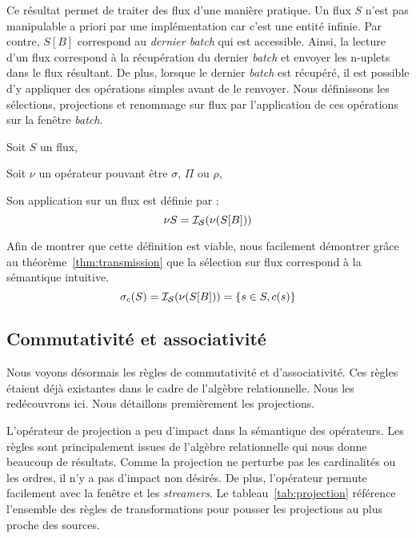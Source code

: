 Ce résultat permet de traiter des flux d'une manière pratique. Un flux $S$ n'est pas manipulable a priori par une implémentation car c'est une entité infinie. Par contre, $S[B]$ correspond au \textit{dernier batch} qui est accessible. Ainsi, la lecture d'un flux correspond à la récupération du dernier \textit{batch} et envoyer les n-uplets dans le flux résultant. De plus, lorsque le dernier \textit{batch} est récupéré, il est possible d'y appliquer des opérations simples avant de le renvoyer. Nous définissons les sélections, projections et renommage sur flux par l'application de ces opérations sur la fenêtre \textit{batch}.

\begin{coro}\label{cor:defunary}
    Soit $S$ un flux,

    Soit $\nu$ un opérateur pouvant être $\sigma$, $\Pi$ ou $\rho$,

    Son application sur un flux est définie par :
$$\nu S = \mathcal{I_S}(\nu(S[B]))$$
\end{coro}

Afin de montrer que cette définition est viable, nous facilement démontrer grâce au théorème~\ref{thm:transmission} que la sélection sur flux correspond à la sémantique intuitive. $$\sigma_c(S) = \mathcal{I_S}(\nu(S[B])) = \{s\in S, c(s)\}$$

\subsection{Commutativité et associativité}
Nous voyons désormais les règles de commutativité et d'associativité. Ces règles étaient déjà existantes dans le cadre de l'algèbre relationnelle. Nous les redécouvrons ici. Nous détaillons premièrement les projections.

L'opérateur de projection a peu d'impact dans la sémantique des opérateurs. Les règles sont principalement issues de l'algèbre relationnelle qui nous donne beaucoup de résultats. Comme la projection ne perturbe pas les cardinalités ou les ordres, il n'y a pas d'impact non désirés. De plus, l'opérateur permute facilement avec la fenêtre et les \textit{streamers}. Le tableau~\ref{tab:projection} référence l'ensemble des règles de transformations pour pousser les projections au plus proche des sources.

